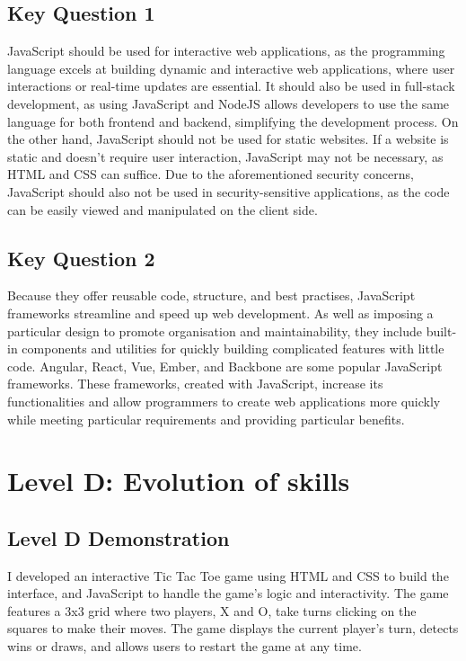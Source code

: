 \documentclass[a4paper, 11pt]{report}
\begin{document}
\subsection{Key Question 1}
JavaScript should be used for interactive web applications, as the programming language excels at building dynamic and interactive web applications, where user interactions or real-time updates are essential. It should also be used in full-stack development, as using JavaScript and NodeJS allows developers to use the same language for both frontend and backend, simplifying the development process. On the other hand, JavaScript should not be used for static websites. If a website is static and doesn't require user interaction, JavaScript may not be necessary, as HTML and CSS can suffice. Due to the aforementioned security concerns, JavaScript should also not be used in security-sensitive applications, as the code can be easily viewed and manipulated on the client side. 


\subsection{Key Question 2}
Because they offer reusable code, structure, and best practises, JavaScript frameworks streamline and speed up web development. As well as imposing a particular design to promote organisation and maintainability, they include built-in components and utilities for quickly building complicated features with little code. Angular, React, Vue, Ember, and Backbone are some popular JavaScript frameworks. These frameworks, created with JavaScript, increase its functionalities and allow programmers to create web applications more quickly while meeting particular requirements and providing particular benefits.


\newpage
\section{Level D: Evolution of skills}
\vspace{5mm}
\subsection{Level D Demonstration}

I developed an interactive Tic Tac Toe game using HTML and CSS to build the interface, and JavaScript to handle the game's logic and interactivity. The game features a 3x3 grid where two players, X and O, take turns clicking on the squares to make their moves. The game displays the current player's turn, detects wins or draws, and allows users to restart the game at any time. 
\end{document}
